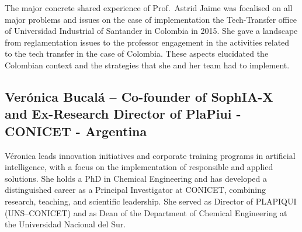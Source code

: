 \documentclass[
  12pt,
  oneside]{book}
\begin{document}
The major concrete shared experience of Prof.~Astrid Jaime was focalised
on all major problems and issues on the case of implementation the
Tech-Transfer office of Universidad Industrial of Santander in Colombia
in 2015. She gave a landscape from reglamentation issues to the
professor engagement in the activities related to the tech transfer in
the case of Colombia. These aspects elucidated the Colombian context and
the strategies that she and her team had to implement.

\subsection{Verónica Bucalá -- Co-founder of SophIA-X and Ex-Research
Director of PlaPiui - CONICET -
Argentina}\label{veruxf3nica-bucaluxe1-co-founder-of-sophia-x-and-ex-research-director-of-plapiui---conicet---argentina}

Véronica leads innovation initiatives and corporate training programs in
artificial intelligence, with a focus on the implementation of
responsible and applied solutions. She holds a PhD in Chemical
Engineering and has developed a distinguished career as a Principal
Investigator at CONICET, combining research, teaching, and scientific
leadership. She served as Director of PLAPIQUI (UNS--CONICET) and as
Dean of the Department of Chemical Engineering at the Universidad
Nacional del Sur.
\end{document}
